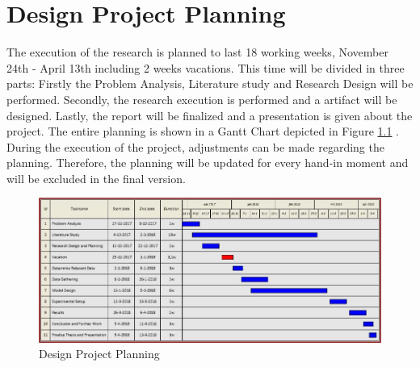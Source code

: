 
\chapter{Design Project Planning} \label{AppendixB}
The execution of the research is planned to last 18 working weeks, November 24th - April 13th including 2 weeks vacations. This time will be divided in three parts: Firstly the Problem Analysis, Literature study and Research Design will be performed. Secondly, the research execution is performed and a artifact will be designed. Lastly, the report will be finalized and a presentation is given about the project. The entire planning is shown in a Gantt Chart depicted in Figure \ref{fig:Planning} . During the execution of the project, adjustments can be made regarding the planning. Therefore, the planning will be updated for every hand-in moment and will be excluded in the final version.
\begin{figure}[htbp]
\centering
\includegraphics[angle=90]{Figures/Research_Planning}
\caption{Design Project Planning}
\label{fig:Planning}
\end{figure}